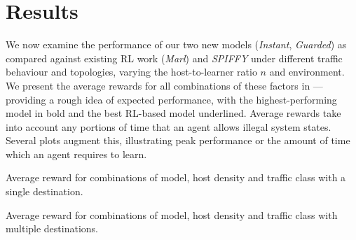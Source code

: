 \documentclass[10pt, times, comsoc]{IEEEtran}
\begin{document}
\section{Results}
\label{sec:the-results-of-doing-so}

We now examine the performance of our two new models (\emph{Instant}, \emph{Guarded}) as compared against existing RL work (\emph{Marl}) and {\color{revisiontext} \cbstart \emph{SPIFFY} under different traffic behaviour and topologies, varying the host-to-learner ratio $n$ and environment.
We present the average rewards for all combinations of these factors in ---providing a rough idea of expected performance, with the highest-performing model in bold and the best RL-based model \cbend underlined.}
Average rewards take into account any portions of time that an agent allows illegal system states.
Several plots augment this, illustrating peak performance or the amount of time which an agent requires to learn.

\begin{table}
	\centering
	\caption{Average reward for combinations of model, host density and traffic class with a single destination.\label{tab:av-vals}}
	
	\cbstart
	\cbend
\vspace{-0.25cm}
\end{table}
\begin{table}
	\centering
	\caption{Average reward for combinations of model, host density and traffic class with multiple destinations.\label{tab:av-ecmp-vals}}
	
	\cbstart
	\cbend
\vspace{-0.5cm}
\end{table}
\end{document}
